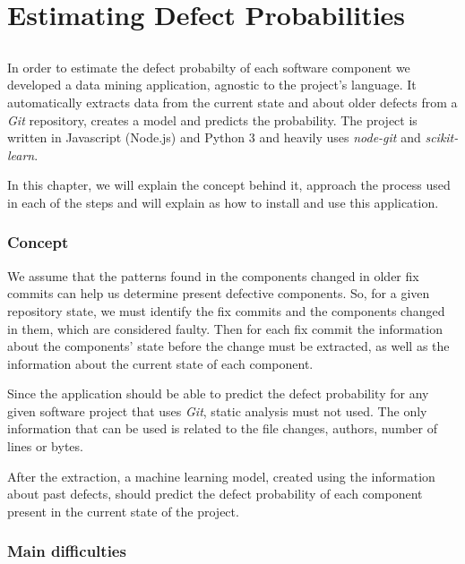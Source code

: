 \chapter{Estimating Defect Probabilities} \label{chap:chap3}

\section*{}

In order to estimate the defect probabilty of each software component we developed a data mining application, agnostic to the project's language. 
It automatically extracts data from the current state and about older defects from a \emph{Git} repository, creates a model and predicts the probability. The project is written in Javascript (Node.js) and Python 3 and heavily uses \emph{node-git}
and \emph{scikit-learn}.

In this chapter, we will explain the concept behind it, approach the process used in each of the steps and will explain as how to install and use this application.

\subsection{Concept}

We assume that the patterns found in the components changed in older fix commits can help us determine present defective components. 
So, for a given repository state, we must identify the fix commits and the components changed in them, which are considered faulty.
Then for each fix commit the information about the components' state before the change must be extracted, as well as the information about the current state of each component.

Since the application should be able to predict the defect probability for any given software project that uses \emph{Git}, static analysis must not used. 
The only information that can be used is related to the file changes, authors, number of lines or bytes.

After the extraction, a machine learning model, created using the information about past defects, should predict the defect probability of each component present in the current state of the project.


\subsection{Main difficulties}

